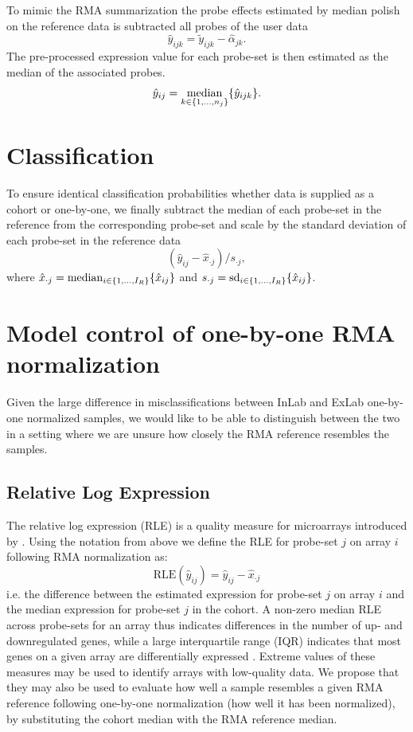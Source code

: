 To mimic the RMA summarization the probe effects estimated by median polish on the reference data is subtracted all probes of the user data
\begin{equation*}
   \hat{y}_{ijk} = \tilde{y}_{ijk} - \hat{\alpha}_{jk}.
\end{equation*}
The pre-processed expression value for each probe-set is then estimated as the median of the associated probes.
\begin{equation*}
   \hat{y}_{ij} = \operatorname*{median}_{k \in \{1,\dots,n_j \}} \{ \hat{y}_{ijk} \}.
\end{equation*}


\section{Classification}
To ensure identical classification probabilities whether data is supplied as a cohort or one-by-one, we finally subtract the median of each probe-set in the reference from the corresponding probe-set and scale by the standard deviation of each probe-set in the reference data
\begin{equation*}
  (\hat{y}_{ij} - \hat{x}_{\cdot j})/s_{\cdot j},
\end{equation*}
where
$\hat{x}_{\cdot j} = \operatorname*{median}_{i \in \{1,\dots,I_R \}} \{\hat{x}_{ij}\}$ and
$s_{\cdot j} = \operatorname*{sd}_{i \in \{1,\dots,I_R\}} \{\hat{x}_{ij}\}$.


\section{Model control of one-by-one RMA normalization} \label{sec_rle}
Given the large difference in misclassifications  between InLab and ExLab one-by-one normalized samples, we would like to be able to distinguish between the two in a setting where we are unsure how closely the RMA reference resembles the samples.

\subsection{Relative Log Expression} 
The relative log expression (RLE)	is a quality measure for microarrays introduced by \mbox{\citet{Bolstad2004b}}. Using the notation from above we define the RLE for probe-set $j$ on array $i$ following RMA normalization as:
\[
	\textrm{RLE}(\hat{y}_{ij}) = \hat{y}_{ij} - \hat{x}_{\cdot j}
\]
i.e. the difference between the estimated expression for probe-set $j$ on array $i$ and the median expression for probe-set $j$ in the cohort. A non-zero median RLE across probe-sets for an array thus indicates differences in the number of up- and downregulated genes, while a large interquartile range (IQR) indicates that most genes on a given array are differentially expressed \mbox{\citep{McCall2011}}. Extreme values of these measures may be used to identify arrays with low-quality data. We propose that they may also be used to evaluate how well a sample resembles a given RMA reference following one-by-one normalization (how well it has been normalized), by substituting the cohort median with the RMA reference median.

